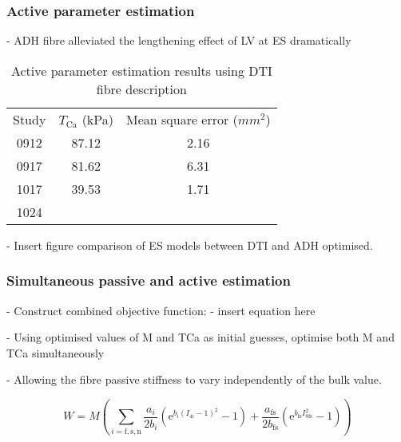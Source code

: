 \documentclass{llncs}
\begin{document}
\subsubsection{Active parameter estimation}
- ADH fibre alleviated the lengthening effect of LV at ES dramatically

\begin{table}[H]
	\caption{Active parameter estimation results using DTI fibre description}
	\begin{center}
		\renewcommand{\arraystretch}{1.2}
		\setlength\tabcolsep{8pt}
		\begin{tabular}{ccc}
		\hline\noalign{\smallskip}
		Study & $T_{\mathrm{Ca}}$ (kPa) & Mean square error ($mm^{2}$)\\
		\noalign{\smallskip}
		\hline
		\noalign{\smallskip}
		0912 & 87.12 & 2.16 \\
		\noaling{\smallskip}
		0917 & 81.62 & 6.31 \\ 
		\noaling{\smallskip}
		1017 & 39.53 & 1.71\\ 
		\noaling{\smallskip}
		1024 &  & \\ 
		\hline
		\end{tabular}
	\end{center}
\end{table}

- Insert figure comparison of ES models between DTI and ADH optimised. 

\subsubsection{Simultaneous passive and active estimation}
- Construct combined objective function:
	- insert equation here

- Using optimised values of M and TCa as initial guesses, optimise both M and TCa simultaneously

- Allowing the fibre passive stiffness to vary independently of the bulk value. 



\begin{equation}
W=M\left(\sum\limits_{i=\mathrm{f,s,n}} \frac{a_{i}}{2b_{i}} \left(\mathrm{e}^{b_{i}(I_{\mathrm{4}i}-1)^2}-1\right)+ \frac{a_{\mathrm{fs}}}{2b_{\mathrm{fs}}} \left(\mathrm{e}^{b_{\mathrm{fs}}I^{2}_{8\mathrm{fs}}} -1\right)\right)
\end{equation}
\end{document}
